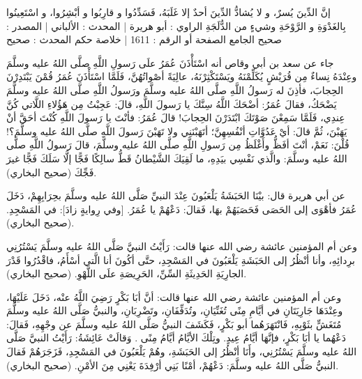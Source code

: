 إنَّ الدِّينَ يُسرٌ، و لا يُشادُّ الدِّينَ أحدٌ إلا غَلَبَهُ، فَسَدِّدُوا و قارِبُوا و أبْشِرُوا، و اسْتَعِينُوا بِالغَدْوَةِ و الرَّوْحَةِ وشيءٍ من الدُّلَجَةِ
الراوي : أبو هريرة | المحدث : الألباني | المصدر : صحيح الجامع
الصفحة أو الرقم : 1611 | خلاصة حكم المحدث : صحيح 

جاء عن سعد بن أبي وقاص أنه اسْتَأْذَنَ عُمَرُ علَى رَسولِ اللَّهِ صلَّى اللهُ عليه وسلَّمَ وعِنْدَهُ نِساءٌ مِن قُرَيْشٍ يُكَلِّمْنَهُ ويَسْتَكْثِرْنَهُ، عالِيَةً أصْواتُهُنَّ، فَلَمَّا اسْتَأْذَنَ عُمَرُ قُمْنَ يَبْتَدِرْنَ الحِجابَ، فأذِنَ له رَسولُ اللَّهِ صلَّى اللهُ عليه وسلَّمَ ورَسولُ اللَّهِ صلَّى اللهُ عليه وسلَّمَ يَضْحَكُ، فقالَ عُمَرُ: أضْحَكَ اللَّهُ سِنَّكَ يا رَسولَ اللَّهِ، قالَ: عَجِبْتُ مِن هَؤُلاءِ اللَّاتي كُنَّ عِندِي، فَلَمَّا سَمِعْنَ صَوْتَكَ ابْتَدَرْنَ الحِجابَ! قالَ عُمَرُ: فأنْتَ يا رَسولَ اللَّهِ كُنْتَ أحَقَّ أنْ يَهَبْنَ، ثُمَّ قالَ: أيْ عَدُوَّاتِ أنْفُسِهِنَّ؛ أتَهَبْنَنِي ولا تَهَبْنَ رَسولَ اللَّهِ صلَّى اللهُ عليه وسلَّمَ؟! قُلْنَ: نَعَمْ، أنْتَ أفَظُّ وأَغْلَظُ مِن رَسولِ اللَّهِ صلَّى اللهُ عليه وسلَّمَ، قالَ رَسولُ اللَّهِ صلَّى اللهُ عليه وسلَّمَ: والَّذي نَفْسِي بيَدِهِ، ما لَقِيَكَ الشَّيْطانُ قَطُّ سالِكًا فَجًّا إلَّا سَلَكَ فَجًّا غيرَ فَجِّكَ {\footnotesize (صحيح البخاري)}.

عن أبي هريرة قال: بيْنَا الحَبَشَةُ يَلْعَبُونَ عِنْدَ النبيِّ صَلَّى اللهُ عليه وسلَّمَ بحِرَابِهِمْ، دَخَلَ عُمَرُ فأهْوَى إلى الحَصَى فَحَصَبَهُمْ بهَا، فَقالَ: دَعْهُمْ يا عُمَرُ. [وفي رِوايةٍ زادَ]: في المَسْجِدِ. {\footnotesize (صحيح البخاري)}.

وعن أم المؤمنين عائشة رضي الله عنها قالت: رَأَيْتُ النبيَّ صَلَّى اللهُ عليه وسلَّمَ يَسْتُرُنِي برِدائِهِ، وأنا أنْظُرُ إلى الحَبَشَةِ يَلْعَبُونَ في المَسْجِدِ، حتَّى أكُونَ أنا الَّتي أسْأَمُ، فاقْدُرُوا قَدْرَ الجارِيَةِ الحَدِيثَةِ السِّنِّ، الحَرِيصَةِ علَى اللَّهْوِ.
{\footnotesize (صحيح البخاري)}.

وعن أم المؤمنين عائشة رضي الله عنها قالت: أنَّ أبَا بَكْرٍ رَضِيَ اللَّهُ عنْه، دَخَلَ عَلَيْهَا، وعِنْدَهَا جَارِيَتَانِ في أيَّامِ مِنًى تُغَنِّيَانِ، وتُدَفِّفَانِ، وتَضْرِبَانِ، والنبيُّ صَلَّى اللهُ عليه وسلَّمَ مُتَغَشٍّ بثَوْبِهِ، فَانْتَهَرَهُما أبو بَكْرٍ، فَكَشَفَ النبيُّ صَلَّى اللهُ عليه وسلَّمَ عن وجْهِهِ، فَقالَ: دَعْهُما يا أبَا بَكْرٍ، فإنَّهَا أيَّامُ عِيدٍ. وتِلْكَ الأيَّامُ أيَّامُ مِنًى . وَقالَتْ عَائِشَةُ: رَأَيْتُ النبيَّ صَلَّى اللهُ عليه وسلَّمَ يَسْتُرُنِي، وأَنَا أنْظُرُ إلى الحَبَشَةِ، وهُمْ يَلْعَبُونَ في المَسْجِدِ، فَزَجَرَهُمْ فَقالَ النبيُّ صَلَّى اللهُ عليه وسلَّمَ: دَعْهُمْ، أمْنًا بَنِي أرْفِدَةَ يَعْنِي مِنَ الأمْنِ. {\footnotesize (صحيح البخاري)}.

